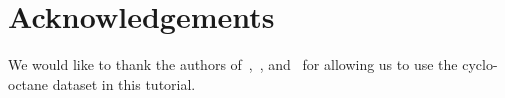 \documentclass[amscd, amssymb, verbatim]{amsart}[12pt]
\theoremstyle{remark}
\theoremstyle{remark}
\theoremstyle{remark}
\begin{document}







\section{Acknowledgements}

We would like to thank the authors of~\citet{brown2008algorithmic},~\citet{martin2010topology}, and~\citet{martin2011non} for allowing us to use the cyclo-octane dataset in this tutorial.
\end{document}

